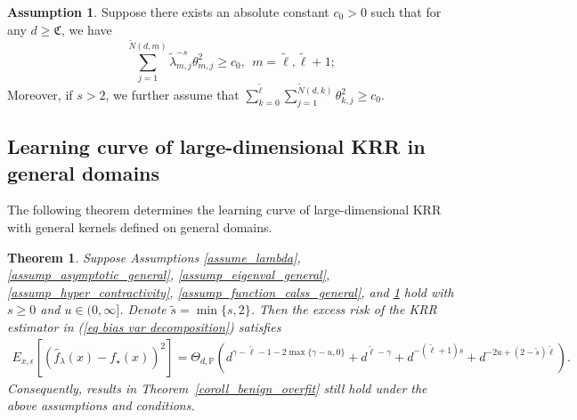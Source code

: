 \documentclass{article}
\theoremstyle{plain}
\newtheorem{theorem}{Theorem}[section]
\theoremstyle{definition}
\newtheorem{assumption}{Assumption} %
\theoremstyle{remark}
\begin{document}
\begin{assumption}\label{assump_source condition_lower_bound_general}
Suppose there exists an absolute constant $c_{0} > 0$ such that for any $ d \geq \mathfrak{C}$, we have
\begin{equation*}
        \sum\limits_{j=1}^{\tilde{N}(d, m)} \tilde{\lambda}_{m, j}^{-s} \theta_{m,j}^{2} \ge c_{0}, ~~m=\tilde{\ell}, \tilde{\ell}+1;
   \end{equation*}
Moreover, if $s> 2$, we further assume that
$\sum\limits_{k=0}^{\tilde{\ell}} \sum\limits_{j =1}^{\tilde{N}(d, k)}  \theta_{k, j}^{2} \ge c_{0}$.
\end{assumption}






















\subsection{Learning curve of large-dimensional KRR in general domains}

The following theorem determines the learning curve of large-dimensional KRR with general kernels defined on general domains.

\begin{theorem}\label{theorem_learn_curve_general}
    Suppose Assumptions \ref{assume_lambda}, 
    \ref{assump_asymptotic_general}, 
    \ref{assump_eigenval_general}, 
    \ref{assump_hyper_contractivity},
\ref{assump_function_calss_general},
and \ref{assump_source condition_lower_bound_general} hold with $s \geq 0$ and $u \in (0, \infty]$. 
Denote $\tilde{s}=\min\{s, 2\}$. Then the excess risk of the KRR estimator in (\ref{eq bias var decomposition}) satisfies
\begin{equation*}
\begin{aligned}
    E_{x, \epsilon} \left[ \left(\hat{f}_{\lambda}(x) - f_{\star}(x) \right)^{2} \right]
= \Theta_{d, \mathbb{P}} \left( 
d^{\gamma - \tilde{\ell} - 1 - 2  \max\{\gamma - u, 0\}}
+ d^{\tilde{\ell} - \gamma}
+ d^{-(\tilde{\ell} + 1)  s}
+ d^{-2  u + (2 - \tilde{s})  \tilde{\ell}}
\right).
\end{aligned}
\end{equation*}
Consequently, results in Theorem~\ref{coroll_benign_overfit} still hold under the above assumptions and conditions.
\end{theorem}
\end{document}
